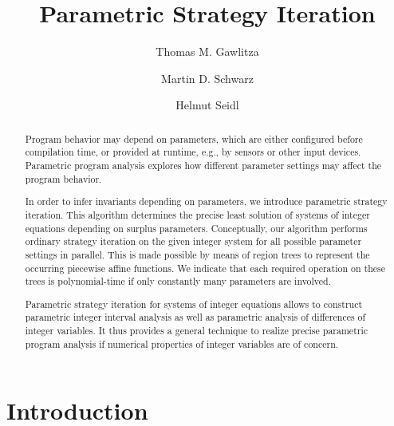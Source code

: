 \documentclass[a4paper]{easychair}
\begin{document}
\newtheorem{example}{Example}
\newtheorem{theorem}{Theorem}
\newtheorem{lemma}{Lemma}



\title{Parametric Strategy Iteration}


\author{Thomas M. Gawlitza \and Martin D. Schwarz \and Helmut Seidl}





\maketitle



\begin{abstract}
Program behavior may depend on parameters, which are either configured
before compilation time, or provided at runtime, e.g., by sensors or other input devices.
Parametric program analysis explores how different parameter settings may affect the
program behavior.

In order to infer invariants depending on parameters, we introduce parametric strategy iteration.
This algorithm determines the precise least solution of systems of integer equations depending
on surplus parameters. Conceptually, our algorithm performs ordinary strategy iteration 
on the given integer system for all possible parameter settings in parallel.
This is made possible by means of region trees to represent the occurring piecewise affine functions.
We indicate that each required operation on these trees is polynomial-time if only constantly many 
parameters are involved.

Parametric strategy iteration for systems of integer equations
allows to construct parametric integer interval analysis
as well as parametric analysis of differences of integer variables.
It thus provides a general technique to realize precise parametric
program analysis if numerical properties of integer variables are of concern.
\end{abstract}




\section{Introduction} \label{s:intro}
\end{document}
